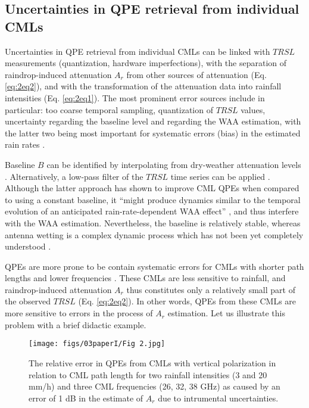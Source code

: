 \documentclass{ctuthesis}\usepackage[]{graphicx}\usepackage[]{color}
\begin{document}
\subsection{Uncertainties in QPE retrieval from individual CMLs} \label{InstErr}

Uncertainties in QPE retrieval from individual CMLs can be linked with $T\!R\!S\!L$ measurements (quantization, hardware imperfections), with the separation of raindrop-induced attenuation $A_r$ from other sources of attenuation (Eq. \ref{eq:2eq2}), and with the transformation of the attenuation data into rainfall intensities (Eq. \ref{eq:2eq1}). The most prominent error sources include in particular: too coarse temporal sampling, quantization of $T\!R\!S\!L$ values, uncertainty regarding the baseline level and regarding the WAA estimation, with the latter two being most important for systematic errors (bias) in the estimated rain rates \citep{leijnseErrorsUncertaintiesMicrowave2010, zinevichPredictionRainfallIntensity2010, chwalaCommercialMicrowaveLink2019}.

Baseline $B$ can be identified by interpolating from dry-weather attenuation levels \citep{overeemMeasuringUrbanRainfall2011, schleissIdentificationDryRainy2010}. Alternatively, a low-pass filter of the $T\!R\!S\!L$ time series can be applied \citep{feniciaMicrowaveLinksRainfall2012}. Although the latter approach has shown to improve CML QPEs when compared to using a constant baseline, it \enquote{might produce dynamics similar to the temporal evolution of an anticipated rain-rate-dependent WAA effect} \citep{chwalaCommercialMicrowaveLink2019}, and thus interfere with the WAA estimation. Nevertheless, the baseline is relatively stable, whereas antenna wetting is a complex dynamic process which has not been yet completely understood \citep[][more in next subsection]{schleissQuantificationModelingWetAntenna2013}.

QPEs are more prone to be contain systematic errors for CMLs with shorter path lengths and lower frequencies \citep{leijnseMicrowaveLinkRainfall2008}. These CMLs are less sensitive to rainfall, and raindrop-induced attenuation $A_r$ thus constitutes only a relatively small part of the observed $T\!R\!S\!L$ (Eq. \ref{eq:2eq2}). In other words, QPEs from these CMLs are more sensitive to errors in the process of $A_r$ estimation. Let us illustrate this problem with a brief didactic example. 

\begin{figure}[h]
\begin{center}
\texttt{[image: figs/03paperI/Fig 2.jpg]}
\caption{The relative error in QPEs from CMLs with vertical polarization in relation to CML path length for two rainfall intensities (3 and 20 mm/h) and three CML frequencies (26, 32, 38 GHz) as caused by an error of 1 dB in the estimate of $A_r$ due to intrumental uncertainties.} \label{2The1}
\end{center}
\end{figure}
\end{document}

